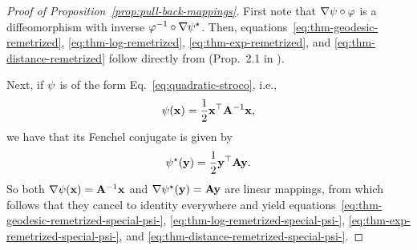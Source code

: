 \begin{proof}[Proof of Proposition~\ref{prop:pull-back-mappings}]
    First note that $\nabla \psi \circ \varphi$ is a diffeomorphism with inverse $\varphi^{-1} \circ \nabla \psi^\star$. Then, equations~\eqref{eq:thm-geodesic-remetrized}, \eqref{eq:thm-log-remetrized}, \eqref{eq:thm-exp-remetrized}, and \eqref{eq:thm-distance-remetrized} follow directly from (Prop.~2.1 in \cite{diepeveen2024pulling}).

    Next, if $\psi$ is of the form Eq.~\eqref{eq:quadratic-stroco}, i.e., 
    $$
        \psi(\mathbf{x})=\frac{1}{2} \mathbf{x}^{\top} \mathbf{A}^{-1} \mathbf{x},
    $$
    we have that its Fenchel conjugate is given by
    \begin{equation}
        \psi^\star(\mathbf{y})=\frac{1}{2} \mathbf{y}^{\top} \mathbf{A} \mathbf{y}.
    \end{equation}
    So both $\nabla \psi(\mathbf{x}) = \mathbf{A}^{-1} \mathbf{x}$ and $\nabla \psi^\star(\mathbf{y}) = \mathbf{A} \mathbf{y}$ are linear mappings, from which follows that they cancel to identity everywhere and yield equations~\eqref{eq:thm-geodesic-remetrized-special-psi-}, \eqref{eq:thm-log-remetrized-special-psi-}, \eqref{eq:thm-exp-remetrized-special-psi-}, and \eqref{eq:thm-distance-remetrized-special-psi-}.
\end{proof}

